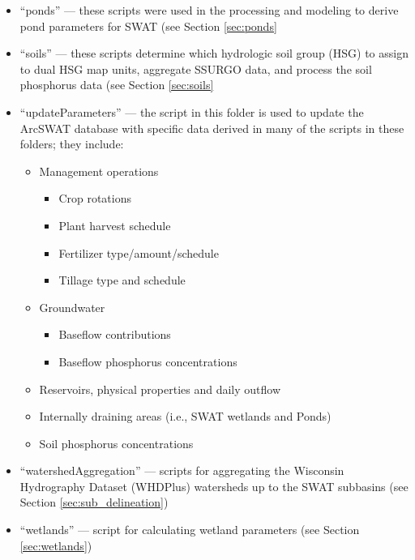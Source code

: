 \begin{itemize}
\item ``ponds'' --- these scripts were used in the processing and modeling to derive pond parameters for SWAT (see Section \ref{sec:ponds} 

\item ``soils'' --- these scripts  determine which hydrologic soil group (HSG) to assign to dual HSG map units, aggregate SSURGO data, and process the soil phosphorus data  (see Section \ref{sec:soils} 

\item ``updateParameters'' --- the script in this folder is used to update the ArcSWAT database with specific data derived in many of the scripts in these folders; they include:
	\begin{itemize}
	\item Management operations
		\begin{itemize}
		\item Crop rotations
		\item Plant harvest schedule
		\item Fertilizer type/amount/schedule
		\item Tillage type and schedule
		\end{itemize}
	\item Groundwater
		\begin{itemize}
		\item Baseflow contributions
		\item Baseflow phosphorus concentrations 
		\end{itemize}
	\item Reservoirs, physical properties and daily outflow
	\item Internally draining areas (i.e., SWAT wetlands and Ponds)
	\item Soil phosphorus concentrations	
	\end{itemize} 

\item ``watershedAggregation'' --- scripts for aggregating the Wisconsin Hydrography Dataset (WHDPlus) watersheds up to the SWAT subbasins (see Section \ref{sec:sub_delineation})

\item ``wetlands'' --- script for calculating wetland parameters  (see Section \ref{sec:wetlands})

\end{itemize}
